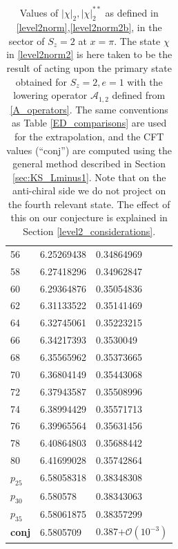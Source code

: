 \documentclass[a4paper,10pt]{article}
\newcommand{\linnea}[1]{$\framebox{\tiny L}$\ \textbf{\texttt{{\color{red}\footnotesize#1}}}}
\begin{document}
\begin{table}[H]
\begin{minipage}{0.5\textwidth}
\begin{tabular}{lll}
 56   & 6.25269438 & 0.34864969 \\
 58   & 6.27418296 & 0.34962847 \\
 60   & 6.29364876 & 0.35054836 \\
 62   & 6.31133522 & 0.35141469 \\
 64   & 6.32745061 & 0.35223215 \\
 66   & 6.34217393 & 0.3530049  \\
 68   & 6.35565962 & 0.35373665 \\
 70   & 6.36804149 & 0.35443068 \\
 72   & 6.37943587 & 0.35508996 \\
 74   & 6.38994429 & 0.35571713 \\
 76   & 6.39965564 & 0.35631456 \\
 78   & 6.40864803 & 0.35688442 \\
 80   & 6.41699028 & 0.35742864 \\
 $p_{25}$ & 6.58058318 & 0.38348308 \\
 $p_{30}$ & 6.580578   & 0.38343063 \\
 $p_{35}$ & 6.58061875 & 0.38357299 \\
 \bf{conj}& 6.5805709 & 0.387$+\mathcal{O}(10^{-3})$ \\ %
\end{tabular}
\end{minipage} \hfill
\caption{
Values of $|\chi|_2,|\chi|_2^{**}$ as defined in \eqref{level2norm},\eqref{level2norm2b}, in the sector of $S_z=2$ at $x=\pi$. The state $\chi$ in \eqref{level2norm2} is here taken to be the result of acting upon the primary state obtained for $S_z=2, e=1$ with the lowering operator $\mathcal{A}_{1,2}$ defined from \eqref{A_operators}.%
%
The same conventions as Table \ref{ED_comparisons} are used for the extrapolation, and the CFT values (``conj'') are computed using the general method described in Section \ref{sec:KS_Lminus1}.  
Note that on the anti-chiral side we do not project on the fourth relevant state. The effect of this on our conjecture is explained in Section \ref{level2_considerations}.
%
}\label{level2opposite}
\end{table}
\end{document}
